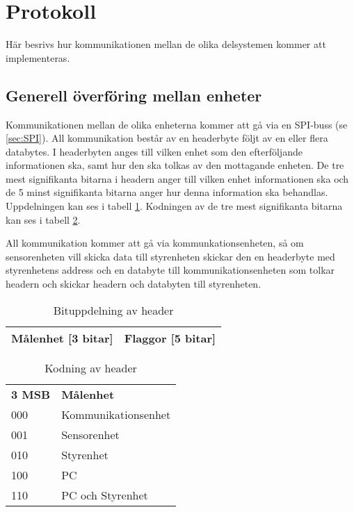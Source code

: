 \section{Protokoll}
Här besrivs hur kommunikationen mellan de olika delsystemen kommer att implementeras.

\subsection{Generell överföring mellan enheter}
Kommunikationen mellan de olika enheterna kommer att gå via en SPI-buss (se \ref{sec:SPI}).
All kommunikation består av en headerbyte följt av en eller flera databytes.
I headerbyten anges till vilken enhet som den efterföljande informationen ska, samt hur den ska tolkas av den mottagande enheten.
De tre mest signifikanta bitarna i headern anger till vilken enhet informationen ska och de 5 minst signifikanta bitarna anger 
hur denna information ska behandlas. Uppdelningen kan ses i tabell \ref{tab:header}.
Kodningen av de tre mest signifikanta bitarna kan ses i tabell \ref{tab:headerkod}.

All kommunikation kommer att gå via kommunkationsenheten, så om sensorenheten vill 
skicka data till styrenheten skickar den en headerbyte med styrenhetens address och en databyte till kommunikationsenheten som 
tolkar headern och skickar headern och databyten till styrenheten.
\begin{table}[h]
  \centering
  \begin{tabular}{| c | c |}
    \hline
    Målenhet [3 bitar] & Flaggor [5 bitar]\\
    \hline
  \end{tabular}
  \caption{Bituppdelning av header}
  \label{tab:header}
\end{table}

\begin{table}[h]
  \centering
  \begin{tabular}{l l}
    \textbf{3 MSB} & \textbf{Målenhet} \\
    000 & Kommunikationsenhet \\
    001 & Sensorenhet \\
    010 & Styrenhet \\
    100 & PC \\
    110 & PC och Styrenhet\\
  \end{tabular}
  \caption{Kodning av header}
  \label{tab:headerkod}
\end{table}


